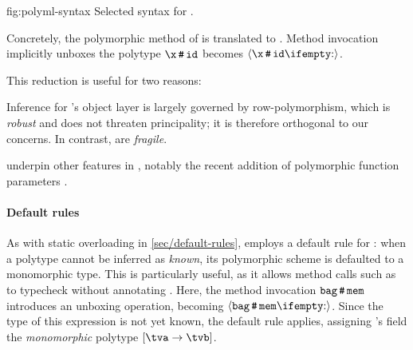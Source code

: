 \documentclass[acmsmall,screen,nonacm%
\Anonymous{,anonymous}{}%
\Final{}{,review}%
]{acmart}
\makeatletter
\newcommand{\BBpolyml}{Garrigue-Remy/poly-ml}
\newcommand{\BBpolyparams}{White/polyparams@ml2023}
\makeatother
\begin{document}
\begin{bnffig}[tb]
  {fig:polyml-syntax}
  {Selected syntax for \polytypes \citep*{\BBpolyml}.}
     \entry[Terms]{\e}{
       \epoly[\ts] \e
       \and \einst \e
       \and \eannot \e {} \t
       \and \dots
     }\\
     \entry[Types]{\t}{
        \tpoly \ts
        \and \dots
     }
\end{bnffig}



Concretely, the polymorphic method of
%
%
is translated to .
Method invocation implicitly unboxes the polytype \eg $\ttlab \x \esend
\ttlab {id}$ becomes $\einst {\ttlab \x \esend \ttlab {id}}$.


This reduction is useful for two reasons:
\begin{enumerate*}
  \item Inference for \OCaml's object layer is largely governed by row-polymorphism,
    which is \emph{robust} and does not threaten principality; it is therefore
    orthogonal to our concerns. In contrast, \polytypes are \emph{fragile}.

  \item \Polytypes underpin other features in \OCaml, notably the recent
    addition of polymorphic function parameters \citep*{\BBpolyparams}.

\end{enumerate*}

\paragraph{Default rules}
\label{sec/default-rules/poly}


As with static overloading in \cref{sec/default-rules}, \OCaml employs a
default rule for \polytypes: when a polytype cannot be inferred as
\emph{known}, its polymorphic scheme is defaulted to a monomorphic type. 
%
This is particularly useful, as it allows method calls such as  
to typecheck without annotating . Here, the method
invocation $\texttt{bag} \,\texttt{\#}\, \texttt{mem}$ introduces an unboxing operation,
becoming $\einst {\texttt{bag} \esend \texttt{mem}}$. Since the type of this
expression is not yet known, the default rule applies, assigning 's
 field the \emph{monomorphic} polytype $\tpoly {\tva \to \tvb}$.
\end{document}
